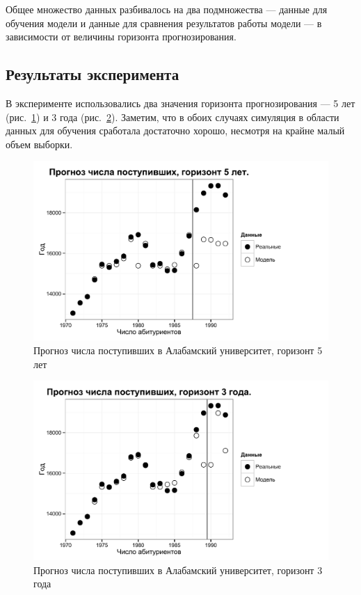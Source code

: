 Общее множество данных разбивалось на два подмножества --- данные для обучения модели и данные для сравнения результатов работы модели --- в зависимости от величины горизонта прогнозирования. 

\subsection{Результаты эксперимента}

В эксперименте использовались два значения горизонта прогнозирования --- 5 лет (рис.~\ref{figure:UA_model_h=5}) и 3 года (рис.~\ref{figure:UA_model_h=3}). Заметим, что в обоих случаях симуляция в области данных для обучения сработала достаточно хорошо, несмотря на крайне малый объем выборки. 

\begin{figure}[bhtp]
    \includegraphics{images/UA_model_h=5.pdf}
    \caption{Прогноз числа поступивших в Алабамский университет, \newline горизонт 5 лет}		
    \label{figure:UA_model_h=5}
\end{figure}

\begin{figure}[bhtp]
    \includegraphics{images/UA_model_h=3.pdf}
    \caption{Прогноз числа поступивших в Алабамский университет, \newline горизонт 3 года}		
    \label{figure:UA_model_h=3}
\end{figure}


